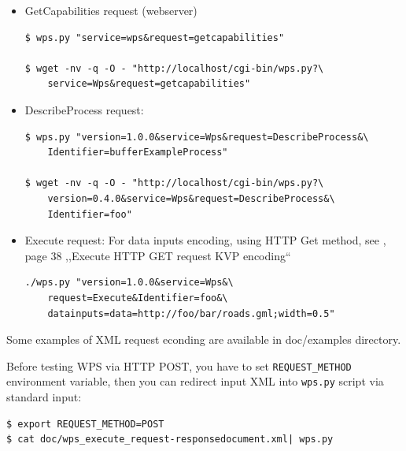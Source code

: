 \documentclass[a4paper,11pt]{report}
\begin{document}
\begin{itemize}
    \item GetCapabilities request (webserver)
\begin{verbatim}
$ wps.py "service=wps&request=getcapabilities"

$ wget -nv -q -O - "http://localhost/cgi-bin/wps.py?\
    service=Wps&request=getcapabilities"
\end{verbatim}
        
    \item DescribeProcess request:
\begin{verbatim}
$ wps.py "version=1.0.0&service=Wps&request=DescribeProcess&\
    Identifier=bufferExampleProcess"

$ wget -nv -q -O - "http://localhost/cgi-bin/wps.py?\
    version=0.4.0&service=Wps&request=DescribeProcess&\
    Identifier=foo"
\end{verbatim}
        
    \item Execute request:
            For data inputs encoding, using HTTP Get method, see
            \pywpsDocCurrent, page 38 ,,Execute HTTP GET request KVP
            encoding``
\begin{verbatim}
./wps.py "version=1.0.0&service=Wps&\
    request=Execute&Identifier=foo&\
    datainputs=data=http://foo/bar/roads.gml;width=0.5"
\end{verbatim}
        
\end{itemize}


Some examples of XML request econding are available in doc/examples
directory.

Before testing WPS via HTTP POST, you have to set \texttt{REQUEST\_METHOD}
environment variable, then you can redirect input XML into \texttt{wps.py}
script via standard input:

\begin{verbatim}
$ export REQUEST_METHOD=POST
$ cat doc/wps_execute_request-responsedocument.xml| wps.py
\end{verbatim}
\end{document}
